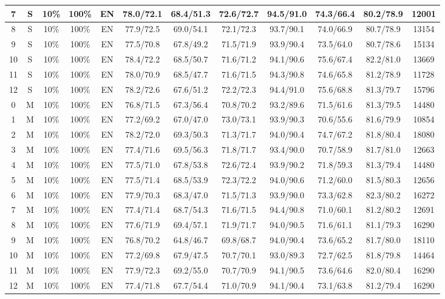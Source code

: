 \begin{table*}
{\begin{tabular}{|c|c|c|c|c||c|c|c|c|c|c||c|}
7 & S & 10\% & 100\% & EN & 78.0/72.1 & 68.4/51.3 & 72.6/72.7 & 94.5/91.0 & 74.3/66.4 & 80.2/78.9 & 12001 \\ \hline
8 & S & 10\% & 100\% & EN & 77.9/72.5 & 69.0/54.1 & 72.1/72.3 & 93.7/90.1 & 74.0/66.9 & 80.7/78.9 & 13154 \\ \hline
9 & S & 10\% & 100\% & EN & 77.5/70.8 & 67.8/49.2 & 71.5/71.9 & 93.9/90.4 & 73.5/64.0 & 80.7/78.6 & 15134 \\ \hline
10 & S & 10\% & 100\% & EN & 78.4/72.2 & 68.5/50.7 & 71.6/71.2 & 94.1/90.6 & 75.6/67.4 & 82.2/81.0 & 13669 \\ \hline
11 & S & 10\% & 100\% & EN & 78.0/70.9 & 68.5/47.7 & 71.6/71.5 & 94.3/90.8 & 74.6/65.8 & 81.2/78.9 & 11728 \\ \hline
12 & S & 10\% & 100\% & EN & 78.2/72.6 & 67.6/51.2 & 72.2/72.3 & 94.4/91.0 & 75.6/68.8 & 81.3/79.7 & 15796 \\ \hline
0 & M & 10\% & 100\% & EN & 76.8/71.5 & 67.3/56.4 & 70.8/70.2 & 93.2/89.6 & 71.5/61.6 & 81.3/79.5 & 14480 \\ \hline
1 & M & 10\% & 100\% & EN & 77.2/69.2 & 67.0/47.0 & 73.0/73.1 & 93.9/90.3 & 70.6/55.6 & 81.6/79.9 & 10854 \\ \hline
2 & M & 10\% & 100\% & EN & 78.2/72.0 & 69.3/50.3 & 71.3/71.7 & 94.0/90.4 & 74.7/67.2 & 81.8/80.4 & 18080 \\ \hline
3 & M & 10\% & 100\% & EN & 77.4/71.6 & 69.5/56.3 & 71.8/71.7 & 93.4/90.0 & 70.7/58.9 & 81.7/81.0 & 12663 \\ \hline
4 & M & 10\% & 100\% & EN & 77.5/71.0 & 67.8/53.8 & 72.6/72.4 & 93.9/90.2 & 71.8/59.3 & 81.3/79.4 & 14480 \\ \hline
5 & M & 10\% & 100\% & EN & 77.5/71.4 & 68.5/53.9 & 72.3/72.2 & 94.0/90.6 & 71.2/60.0 & 81.5/80.3 & 12656 \\ \hline
6 & M & 10\% & 100\% & EN & 77.9/70.3 & 68.3/47.0 & 71.5/71.3 & 93.9/90.0 & 73.3/62.8 & 82.3/80.2 & 16272 \\ \hline
7 & M & 10\% & 100\% & EN & 77.4/71.4 & 68.7/54.3 & 71.6/71.5 & 94.4/90.8 & 71.0/60.1 & 81.2/80.2 & 12691 \\ \hline
8 & M & 10\% & 100\% & EN & 77.6/71.9 & 69.4/57.1 & 71.9/71.7 & 94.0/90.5 & 71.6/61.1 & 81.1/79.3 & 16290 \\ \hline
9 & M & 10\% & 100\% & EN & 76.8/70.2 & 64.8/46.7 & 69.8/68.7 & 94.0/90.4 & 73.6/65.2 & 81.7/80.0 & 18110 \\ \hline
10 & M & 10\% & 100\% & EN & 77.2/69.8 & 67.9/47.5 & 70.7/70.1 & 93.0/89.3 & 72.7/62.5 & 81.8/79.8 & 14464 \\ \hline
11 & M & 10\% & 100\% & EN & 77.9/72.3 & 69.2/55.0 & 70.7/70.9 & 94.1/90.5 & 73.6/64.6 & 82.0/80.4 & 16290 \\ \hline
12 & M & 10\% & 100\% & EN & 77.4/71.8 & 67.7/54.4 & 71.0/70.9 & 94.1/90.4 & 73.1/63.8 & 81.2/79.4 & 16290 \\ \hline
\end{tabular}}
\end{table*}

